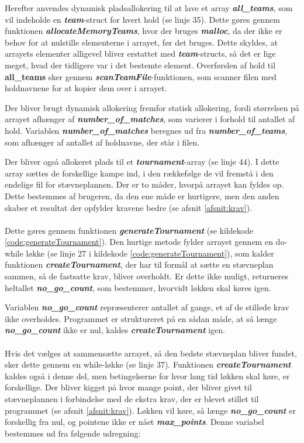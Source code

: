 \clearpage
Herefter anvendes dynamisk pladsallokering til at lave et array \textbf{\textit{all\_teams}}, som vil indeholde en \textbf{\textit{team}}-struct for hvert hold (se linje 35). Dette gøres gennem funktionen \textbf{\textit{allocateMemoryTeams}}, hvor der bruges \textbf{\textit{malloc}}, da der ikke er behov for at nulstille elementerne i arrayet, før det bruges. Dette skyldes, at arrayets elementer alligevel bliver erstattet med \textbf{\textit{team}}-structs, så det er lige meget, hvad der tidligere var i det bestemte element. Overførslen af hold til \textbf{\textbf{all\_teams}} sker gennem \textbf{\textit{scanTeamFile}}-funktionen, som scanner filen med holdnavnene for at kopier dem over i arrayet.
\par
Der bliver brugt dynamisk allokering fremfor statisk allokering, fordi størrelsen på arrayet afhænger af \textbf{\textit{number\_of\_matches}}, som varierer i forhold til antallet af hold. Variablen \textbf{\textit{number\_of\_matches}} beregnes ud fra \textbf{\textit{number\_of\_teams}}, som afhænger af antallet af holdnavne, der står i filen. 
\par
Der bliver også allokeret plads til et \textbf{\textit{tournament}}-array (se linje 44). I dette array sættes de forskellige kampe ind, i den rækkefølge de vil fremstå i den endelige fil for stævneplannen. Der er to måder, hvorpå arrayet kan fyldes op. Dette bestemmes af brugeren, da den ene måde er hurtigere, men den anden skaber et resultat der opfylder kravene bedre (se afsnit \ref{afsnit:krav}). 
\\\\
Dette gøres gennem funktionen \textbf{\textit{generateTournament}} (se kildekode \ref{code:generateTournament}). Den hurtige metode fylder arrayet gennem en do-while løkke (se linje 27 i kildekode \ref{code:generateTournament}), som kalder funktionen \textbf{\textit{createTournament}}, der har til formål at sætte en stævneplan sammen, så de fastsatte krav, bliver overholdt. Er dette ikke muligt, returneres heltallet \textbf{\textit{no\_go\_count}}, som bestemmer, hvorvidt løkken skal køres igen.
\par
Variablen \textbf{\textit{no\_go\_count}} repræsenterer antallet af gange, et af de stillede krav ikke overholdes. Programmet er struktureret på en sådan måde, at så længe \textbf{\textit{no\_go\_count}} ikke er nul, kaldes \textbf{\textit{createTournament}} igen.
\\\\
Hvis det vælges at sammensætte arrayet, så den bedste stævneplan bliver fundet, sker dette gennem en while-løkke (se linje 37). Funktionen \textbf{\textit{createTournament}} kaldes også i denne del, men betingelserne for hvor lang tid løkken skal køre, er forskellige. Der bliver kigget på hvor mange point, der bliver givet til stævneplannen i forbindelse med de ekstra krav, der er blevet stillet til programmet (se afsnit \ref{afsnit:krav}). Løkken vil køre, så længe \textbf{\textit{no\_go\_count}} er forskellig fra nul, og pointene ikke er nået \textbf{\textit{max\_points}}. Denne variabel bestemmes ud fra følgende udregning:
